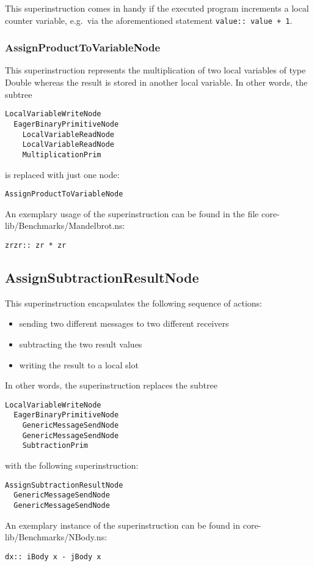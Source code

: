 \documentclass[10pt,a4paper]{article}
\begin{document}
This superinstruction comes in handy if the executed program increments a local counter variable, e.g.\ via the aforementioned statement \verb|value:: value + 1|.

\subsubsection{AssignProductToVariableNode}

This superinstruction represents the multiplication of two local variables of type \textsf{Double} whereas the result is stored in another local variable. In other words, the subtree

\begin{verbatim}
LocalVariableWriteNode
  EagerBinaryPrimitiveNode
    LocalVariableReadNode
    LocalVariableReadNode
    MultiplicationPrim
\end{verbatim}
is replaced with just one node:
\begin{verbatim}
AssignProductToVariableNode
\end{verbatim}
An exemplary usage of the superinstruction can be found in the file \textsf{core-lib/Benchmarks/Mandelbrot.ns}:
\begin{verbatim}
zrzr:: zr * zr
\end{verbatim}

\subsection{AssignSubtractionResultNode}

This superinstruction encapsulates the following sequence of actions:

\begin{itemize}
	\item sending two different messages to two different receivers
	\item subtracting the two result values
	\item writing the result to a local slot
\end{itemize}
In other words, the superinstruction replaces the subtree
\begin{verbatim}
LocalVariableWriteNode
  EagerBinaryPrimitiveNode
    GenericMessageSendNode
    GenericMessageSendNode
    SubtractionPrim
\end{verbatim}
with the following superinstruction:
\begin{verbatim}
AssignSubtractionResultNode
  GenericMessageSendNode
  GenericMessageSendNode
\end{verbatim}
An exemplary instance of the superinstruction can be found in \textsf{core-lib/Benchmarks/NBody.ns}:
\begin{verbatim}
dx:: iBody x - jBody x
\end{verbatim}
\end{document}
